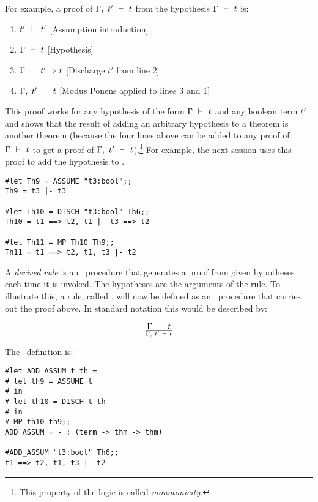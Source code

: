 For example, a proof of $\Gamma,\ t'\ \vdash\  t$ from the hypothesis
$\Gamma\ \vdash\  t$ is:


\begin{enumerate}
\item $t'\ \vdash\  t'$ \hfill [Assumption introduction]
\item $\Gamma\ \vdash\  t$ \hfill [Hypothesis]
\item $\Gamma\ \vdash\  t'\Rightarrow t$ \hfill [Discharge $t'$ from line 2]
\item $\Gamma,\ t'\ \vdash\  t$ \hfill [Modus Ponens applied to lines 3 and 1]
\end{enumerate}

\noindent This proof works for any hypothesis of the form $\Gamma\ \vdash\  t$ 
and any boolean term $t'$ and
shows that the result of adding an arbitrary hypothesis to a theorem is another
theorem (because the four lines above can be added to any proof of
$\Gamma\ \vdash\  t$ to get a proof of $\Gamma,\ t'\ \vdash\  t$).\footnote{This property
of the logic is called {\it monotonicity}.} For example,
the next session uses this proof to add the hypothesis  to
.

\begin{session}\begin{verbatim}
#let Th9 = ASSUME "t3:bool";;
Th9 = t3 |- t3

#let Th10 = DISCH "t3:bool" Th6;;
Th10 = t1 ==> t2, t1 |- t3 ==> t2

#let Th11 = MP Th10 Th9;;
Th11 = t1 ==> t2, t1, t3 |- t2
\end{verbatim}\end{session}


A {\it derived rule\/} is an \ML\ procedure that generates a proof from given hypotheses
each time it is invoked. The hypotheses are the arguments of the rule.
To illustrate this, a rule, called , will now
be defined as an \ML\ procedure that carries
out the proof above. In standard notation this would be described by:

\[ \Gamma\ \vdash\  t\over \Gamma,\ t'\ \vdash\  t \]

\noindent The \ML\ definition is:

\begin{session}\begin{verbatim}
#let ADD_ASSUM t th =
# let th9 = ASSUME t
# in
# let th10 = DISCH t th
# in
# MP th10 th9;;
ADD_ASSUM = - : (term -> thm -> thm)

#ADD_ASSUM "t3:bool" Th6;;
t1 ==> t2, t1, t3 |- t2
\end{verbatim}\end{session}

